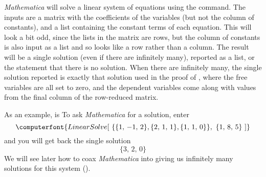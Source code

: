 {\sl Mathematica} will solve a linear system of equations using the  command.  The inputs are a matrix with the coefficients of the variables (but not the column of constants), and a list containing the constant terms of each equation.  This will look a bit odd, since the lists in the matrix are rows, but the column of constants is also input as a list and so looks like a row rather than a column.  The result will be a single solution (even if there are infinitely many), reported as a list, or the statement that there is no solution.  When there are infinitely many, the single solution reported is exactly that solution used in the proof of , where the free variables are all set to zero, and the dependent variables come along with values from the final column of the row-reduced matrix.\par
%
As an example,  is 
%
%
To ask {\sl Mathematica} for a solution, enter
%
\begin{equation*}
\computerfont{
LinearSolve[\ \{\{1,\,-1,\,2\},\{2,\,1,\,1\},\{1,\,1,\,0\}\},\ \{1,\,8,\,5\}\ ]
}
\end{equation*}
and you will get back the single solution
%
\begin{equation*}
\{3,\,2,\,0\}
\end{equation*}
%
We will see later how to coax {\sl Mathematica} into giving us infinitely many solutions for this system ().
